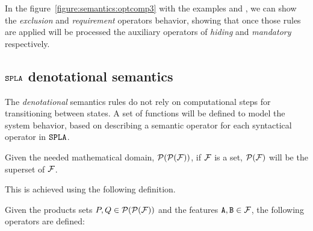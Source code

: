 In the figure~\ref{figure:semantics:optcomp3} with the examples
 and , we can show the \emph{exclusion} and \emph{requirement}
operators behavior, showing that once those rules are applied will be
processed the auxiliary operators of \emph{hiding} and \emph{mandatory}
respectively.

\subsection{$\mathtt{SPLA}$ denotational semantics}
\label{sec:foda:denotational}

The \emph{denotational}
semantics rules do not rely
on computational steps for transitioning between
states. A set of functions will be defined
to model the system behavior, based on describing a
semantic operator for each syntactical operator in $\mathtt{SPLA}$.


Given the needed mathematical domain, ${\cal P}({\cal P}({\cal F}))$,
if ${\cal F}$ is a set,
${\cal P}({\cal F})$ will be the superset of ${\cal F}$.

This is achieved using the following definition.

\bdfn\label{def:semmatic:operators}
Given the products sets $P, Q\in{\cal P}({\cal P}({\cal F}))$
and the features $\mathtt{A},\mathtt{B}\in{\cal F}$,
the following operators are defined:

